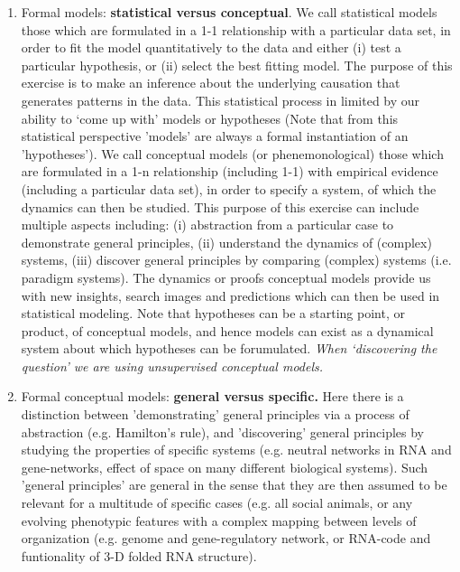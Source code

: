 \begin{enumerate}
\item Formal models:\textbf{ statistical versus conceptual}. We call statistical models those which are formulated in a 1-1 relationship with a particular data set, in order to fit the model quantitatively to the data and either (i) test a particular hypothesis, or (ii) select the best fitting model. The purpose of this exercise is to make an inference about the underlying causation that generates patterns in the data. This statistical process in limited by our ability to `come up with' models or hypotheses (Note that from this statistical perspective 'models' are always a formal instantiation of an 'hypotheses'). We call conceptual models (or phenemonological) those which are formulated in a 1-n relationship (including 1-1) with empirical evidence (including a particular data set), in order to specify a system, of which the dynamics can then be studied. This purpose of this exercise can include multiple aspects including: (i) abstraction from a particular case to demonstrate general principles, (ii) understand the dynamics of (complex) systems, (iii) discover general principles by comparing (complex) systems (i.e. paradigm systems). The dynamics or proofs conceptual models provide us with new insights, search images and predictions which can then be used in statistical modeling. Note that hypotheses can be a starting point, or product, of conceptual models, and hence models can exist as a dynamical system about which hypotheses can be forumulated. \textit{When `discovering the question' we are using unsupervised conceptual models.}
\item Formal conceptual models: \textbf{general versus specific.} Here there is a distinction between 'demonstrating' general principles via a process of abstraction (e.g. Hamilton's rule), and 'discovering' general principles by studying the properties of specific systems (e.g. neutral networks in RNA and gene-networks, effect of space on many different biological systems). Such 'general principles' are general in the sense that they are then assumed to be relevant for a multitude of specific cases (e.g. all social animals, or any evolving phenotypic features with a complex mapping between levels of organization (e.g. genome and gene-regulatory network, or RNA-code and funtionality of 3-D folded RNA structure).
\end{enumerate}
  
  
  
  
  